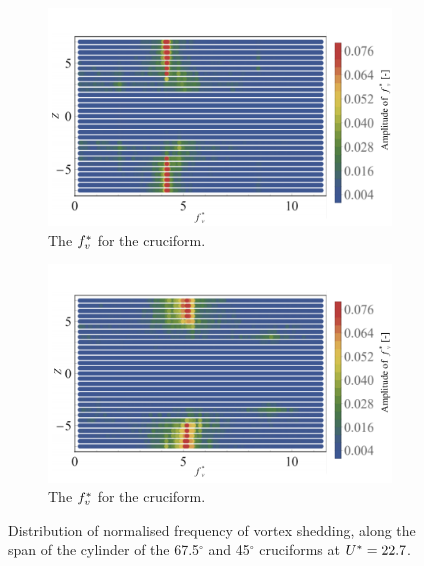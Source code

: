 \documentclass[oneside]{utmthesis}
\begin{document}
\begin{figure}
  \centering

  \begin{subfigure}[h]{1\textwidth}
    \includegraphics[width=\textwidth]{figs/probe675YU10}
    \caption{The $f^{*}_{v}$ for the \angfo{} cruciform.}
    \label{fig:probe675YU10}
  \end{subfigure}

  \begin{subfigure}[h]{1\textwidth}
    \includegraphics[width=\textwidth]{figs/probe45YU10}
    \caption{The $f^{*}_{v}$ for the \angth{} cruciform.}
    \label{fig:probe45YU10}
  \end{subfigure}

  \caption{Distribution of normalised frequency of vortex shedding, along the span of the cylinder of the 67.5$^{\circ}$ and 45$^{\circ}$ cruciforms at $U^{*} = 22.7$.}
  \label{fig:probe67545YU10}
\end{figure}
\end{document}
